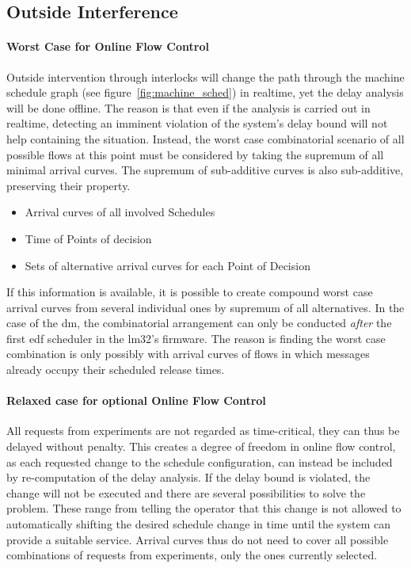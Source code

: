 \subsection{Outside Interference}
\label{ssec:outside_ctrl}
\paragraph{Worst Case for Online Flow Control}
Outside intervention through interlocks will change the path through the machine schedule graph (see figure~\ref{fig:machine_sched}) in realtime, yet the
delay analysis will be done offline. The reason is that even if the analysis is carried out in realtime,
detecting an imminent violation of the system's delay bound will not help containing the situation. Instead, the worst case combinatorial scenario
of all possible flows at this point must be considered by taking the supremum of all minimal arrival curves. The supremum of sub-additive curves is also sub-additive, preserving their property.

\begin{itemize}
\item{Arrival curves of all involved Schedules}
\item{Time of Points of decision}
\item{Sets of alternative arrival curves for each Point of Decision}
\end{itemize}
If this information is available, it is possible to create compound worst case arrival curves from several individual ones by supremum of all alternatives.
In the case of the \gls{dm}, the combinatorial arrangement can only be conducted \emph{after} the first \gls{edf} scheduler in the \gls{lm32}'s firmware.
The reason is finding the worst case combination is only possibly with arrival curves of flows in which messages already occupy their scheduled release times.

\paragraph{Relaxed case for optional Online Flow Control}
All requests from experiments are not regarded as time-critical, they can thus be delayed without penalty. This creates a degree of freedom in online flow control, as each requested change to the schedule configuration,
can instead be included by re-computation of the delay analysis.
If the delay bound is violated, the change will not be executed and there are several possibilities to solve the problem. These range from telling the operator
that this change is not allowed to automatically shifting the desired schedule change in time until the system can provide a suitable service.
Arrival curves thus do not need to cover all possible combinations of requests from experiments, only the ones currently selected.

